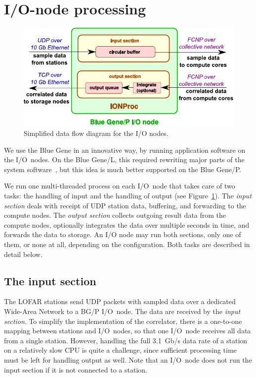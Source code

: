 \documentclass{sig-alternate}
\begin{document}
\section{I/O-node processing}
\label{sec:IONProc}

\begin{figure}[t]
\includegraphics[width=\columnwidth]{ION-processing.pdf}
\caption{Simplified data flow diagram for the I/O nodes.}
\label{fig:ion-processing}
\end{figure}

We use the Blue Gene in an innovative way, by running application software
on the I/O~nodes.
On the Blue Gene/L, this required rewriting major parts of the system
software~\cite{Iskra:08}, but this idea is much better supported on the
Blue Gene/P.

We run one multi-threaded process on each I/O~node that takes care of two
tasks: the handling of input and the handling of output (see
Figure~\ref{fig:ion-processing}).
The \emph{input section\/} deals with receipt of UDP station data, buffering,
and forwarding to the compute nodes.
The \emph{output section\/} collects outgoing result data from the compute
nodes, optionally integrates the data over multiple seconds in time, and
forwards the data to storage.
An I/O node may run both sections, only one of them, or none at all, depending
on the configuration.
Both tasks are described in detail below.


\subsection{The input section}
\label{sec:input-handling}

The LOFAR stations send UDP packets with sampled data over a
dedicated Wide-Area Network to a BG/P I/O~node.
The data are received by the \emph{input section}.
To simplify the implementation of the correlator, there is a one-to-one
mapping between stations and I/O~nodes, so that one I/O~node receives all
data from a single station.
However, handling the full 3.1~Gb/s data rate of a station on a relatively
slow CPU is quite a challenge, since sufficient processing time must be left
for handling output as well.
Note that an I/O~node does not run the input section if it is not
connected to a station.
\end{document}
